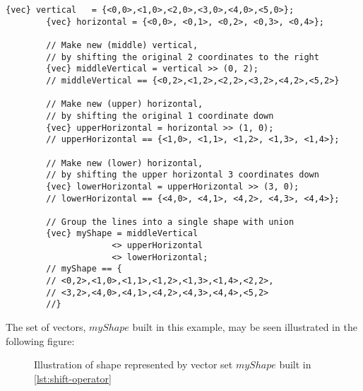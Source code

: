     \begin{lstlisting}[language=aros,caption=Examples of the shift operator, label=lst:shift-operator]
        {vec} vertical   = {<0,0>,<1,0>,<2,0>,<3,0>,<4,0>,<5,0>};
        {vec} horizontal = {<0,0>, <0,1>, <0,2>, <0,3>, <0,4>};
        
        // Make new (middle) vertical,
        // by shifting the original 2 coordinates to the right
        {vec} middleVertical = vertical >> (0, 2);
        // middleVertical == {<0,2>,<1,2>,<2,2>,<3,2>,<4,2>,<5,2>}
        
        // Make new (upper) horizontal,
        // by shifting the original 1 coordinate down
        {vec} upperHorizontal = horizontal >> (1, 0);
        // upperHorizontal == {<1,0>, <1,1>, <1,2>, <1,3>, <1,4>};
        
        // Make new (lower) horizontal,
        // by shifting the upper horizontal 3 coordinates down
        {vec} lowerHorizontal = upperHorizontal >> (3, 0);
        // lowerHorizontal == {<4,0>, <4,1>, <4,2>, <4,3>, <4,4>};
        
        // Group the lines into a single shape with union
        {vec} myShape = middleVertical 
                     <> upperHorizontal
                     <> lowerHorizontal;
        // myShape == {
        // <0,2>,<1,0>,<1,1>,<1,2>,<1,3>,<1,4>,<2,2>,
        // <3,2>,<4,0>,<4,1>,<4,2>,<4,3>,<4,4>,<5,2>
        //}
    \end{lstlisting}
    The set of vectors, $myShape$ built in this example, may be seen illustrated in the following figure:
    \begin{figure}[H]
        \centering
        \caption{Illustration of shape represented by vector set $myShape$ built in \cref{lst:shift-operator}}
    \end{figure}
